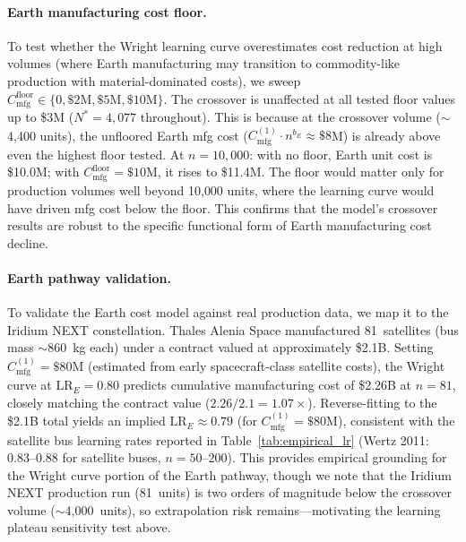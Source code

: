 \documentclass[preprint,12pt]{elsarticle}
\begin{document}
\paragraph{Earth manufacturing cost floor.} To test whether the Wright learning curve overestimates cost reduction at high volumes (where Earth manufacturing may transition to commodity-like production with material-dominated costs), we sweep $C_{\mathrm{mfg}}^{\mathrm{floor}} \in \{0, \$2\text{M}, \$5\text{M}, \$10\text{M}\}$. The crossover is unaffected at all tested floor values up to \$3M ($N^* = 4{,}077$ throughout). This is because at the crossover volume ($\sim$4{,}400 units), the unfloored Earth mfg cost ($C_{\mathrm{mfg}}^{(1)} \cdot n^{b_E} \approx \$8$M) is already above even the highest floor tested. At $n = 10{,}000$: with no floor, Earth unit cost is \$10.0M; with $C_{\mathrm{mfg}}^{\mathrm{floor}} = \$10$M, it rises to \$11.4M. The floor would matter only for production volumes well beyond 10{,}000 units, where the learning curve would have driven mfg cost below the floor. This confirms that the model's crossover results are robust to the specific functional form of Earth manufacturing cost decline.

\paragraph{Earth pathway validation.} To validate the Earth cost model against real production data, we map it to the Iridium NEXT constellation. Thales Alenia Space manufactured 81~satellites (bus mass $\sim$860~kg each) under a contract valued at approximately \$2.1B. Setting $C_{\mathrm{mfg}}^{(1)} = \$80$M (estimated from early spacecraft-class satellite costs), the Wright curve at $\mathrm{LR}_E = 0.80$ predicts cumulative manufacturing cost of \$2.26B at $n = 81$, closely matching the contract value ($2.26/2.1 = 1.07\times$). Reverse-fitting to the \$2.1B total yields an implied $\mathrm{LR}_E \approx 0.79$ (for $C_{\mathrm{mfg}}^{(1)} = \$80$M), consistent with the satellite bus learning rates reported in Table~\ref{tab:empirical_lr} (Wertz 2011: 0.83--0.88 for satellite buses, $n = 50$--$200$). This provides empirical grounding for the Wright curve portion of the Earth pathway, though we note that the Iridium NEXT production run (81~units) is two orders of magnitude below the crossover volume ($\sim$4{,}000~units), so extrapolation risk remains---motivating the learning plateau sensitivity test above.
\end{document}
